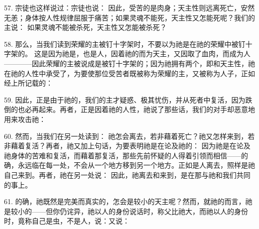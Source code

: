 57. 宗徒也这样说过：宗徒也说： 因此，受苦的是肉身；天主性则远离死亡，安然无恙；身体按人性规律屈服于痛苦；如果灵魂不能死，天主性又怎能死呢？我们的主说： 如果灵魂不能被杀死，天主性又怎能被杀死？\par

58. 那么，当我们读到荣耀的主被钉十字架时，不要以为祂是在祂的荣耀中被钉十字架的。 这是因为祂是，也是人，因着祂的而为天主，又因取了血肉，而成为人————因此荣耀的主被说成是被钉十字架的；因为祂拥有两个，即和天主性，祂在祂的人性中承受了，为要使那位受苦者既被称为荣耀的主，又被称为人子，正如经上所记载的：\par

\par

59. 因此，正是由于祂的，我们的主才疑惑、极其忧伤，并从死者中复活，因为跌倒的也必再起来。再者，正是因着祂的人性，祂说了那些话，我们的对手却恶意地用来攻击祂：\par

60. 然而，当我们在另一处读到： 祂怎会离去，若非藉着死亡？祂又怎样来到，若非藉着复活？再者，祂又加上句话，为要表明祂是在论及祂的： 因为祂是在论及祂身体的苦难和复活，而藉着那复活，那些先前怀疑的人得着引领而相信——的确，永远临在每一处，不会从一个地方移到另一个地方。正如是人离去，照样是祂自己来到。再者，祂在另一处说： 因此，祂离去和来到，是在那与祂和我们共同的事上。\par

61. 的确，祂既然是完美而真实的，怎会是较小的天主呢？然而，就祂的而言，祂是较小的——但你仍诧异，祂以人的身份说话时，称父比祂大，而祂以人的身份时，竟称自己是虫，不是人，说：又说：\par

